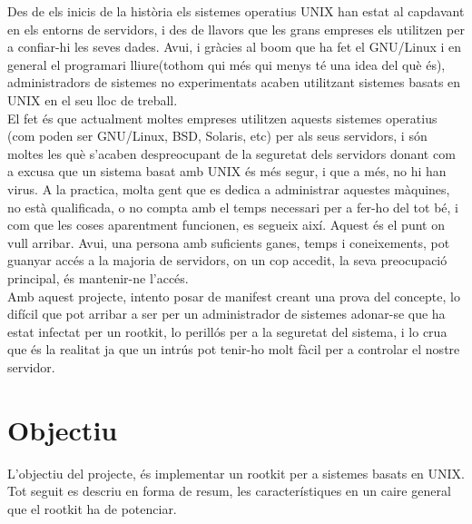 \documentclass[a4paper]{article}
\begin{document}
Des de els inicis de la història els sistemes operatius UNIX han estat al capdavant en els
entorns de servidors, i des de llavors que les grans empreses els utilitzen per a confiar-hi
les seves dades. Avui, i gràcies al boom que ha fet el GNU/Linux i en general el programari lliure(tothom qui més qui
menys té una idea del què és), administradors de sistemes no experimentats acaben
utilitzant sistemes basats en UNIX en el seu lloc de treball. \\
El fet és que actualment moltes empreses utilitzen aquests sistemes operatius (com poden ser
GNU/Linux, BSD, Solaris, etc) per als seus servidors, i són moltes les què s'acaben despreocupant
de la seguretat dels servidors donant com a excusa que un sistema basat amb UNIX és
més segur, i que a més, no hi han virus. A la practica, molta gent que es dedica a
administrar aquestes màquines, no està qualificada, o no compta amb el temps necessari
per a fer-ho del tot bé, i com que les coses aparentment funcionen, es segueix així.
Aquest és el punt on vull arribar. Avui, una persona amb suficients ganes, temps i
coneixements, pot guanyar accés a la majoria de servidors, on un cop accedit, la seva
preocupació principal, és mantenir-ne l'accés.\\

Amb aquest projecte, intento posar de manifest creant una prova del concepte, lo difícil
que pot arribar a ser per un administrador de sistemes adonar-se que ha estat infectat per
un rootkit, lo perillós per a la seguretat del sistema, i lo crua que és la realitat ja que un
intrús pot tenir-ho molt fàcil per a controlar el nostre servidor. \\

\section{Objectiu}

L'objectiu del projecte, és implementar un rootkit per a sistemes basats en UNIX. Tot seguit
es descriu en forma de resum, les característiques en un caire general que el rootkit ha de potenciar. \\
\end{document}
